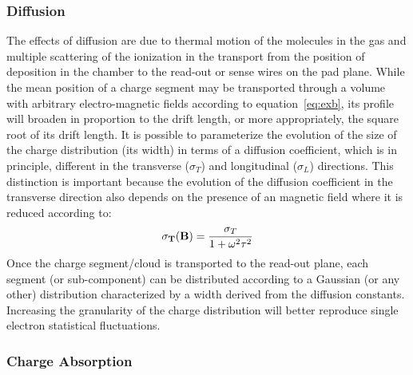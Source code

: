 \documentclass[twoside]{article}
\begin{document}
\subsubsection{Diffusion}

The effects of diffusion are due to thermal motion of the molecules
in the gas and multiple scattering of
the ionization in the transport from the position of deposition
in the chamber to the read-out or sense wires on the pad plane.
While the mean position of a charge segment may be transported through
a volume with arbitrary electro-magnetic fields according to
equation~\ref{eq:exb}, its profile will broaden
in proportion to the drift length, or more appropriately,
the square root of its drift length.
It is possible to parameterize the evolution of the size of the
charge distribution (its width) in terms of a diffusion coefficient,
which is in principle,
different in the transverse ($\sigma_{T}$) and longitudinal ($\sigma_{L}$)
directions.  This distinction is important because the evolution
of the diffusion coefficient in the transverse direction also
depends on the presence of an magnetic field where it is
reduced according to:
\begin{equation}
{\bf \sigma_{T}(B)} = \frac{\sigma_{T}}{1 + \omega ^{2} \tau ^{2}}
\label{eq:diffusion}
\end{equation}
Once the charge segment/cloud is transported to the read-out plane,
each segment (or sub-component) can be distributed according to a
Gaussian (or any other) distribution characterized by a width derived
from the diffusion constants.  Increasing the granularity of the
charge distribution will better reproduce single electron statistical
fluctuations.

\subsubsection{Charge Absorption}
        
\end{document}
